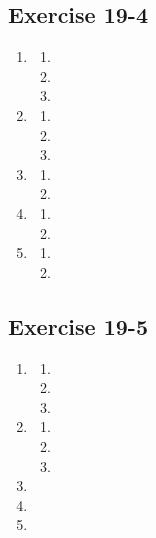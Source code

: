 \subsection{Exercise 19-4}
\begin{multicols}{4}
 \begin{enumerate}[noitemsep, label=\textbf{(\arabic*)} ]
  \item 
\begin{enumerate}[noitemsep, label=\textbf{(\alph*)} ]
 \item 
\item
\item
\end{enumerate}
  \item 
\begin{enumerate}[noitemsep, label=\textbf{(\alph*)} ]
 \item 
\item
\item 
\end{enumerate}
\item
\begin{enumerate}[noitemsep, label=\textbf{(\alph*)} ]
 \item 
\item
\end{enumerate}
\item
\begin{enumerate}[noitemsep, label=\textbf{(\alph*)} ]
 \item 
\item
\end{enumerate}
\item
\begin{enumerate}[noitemsep, label=\textbf{(\alph*)} ]
 \item 
\item
\end{enumerate}
 \end{enumerate}
\end{multicols}

\subsection{Exercise 19-5}
\begin{multicols}{4}
 \begin{enumerate}[noitemsep, label=\textbf{(\arabic*)} ]
  \item 
\begin{enumerate}[noitemsep, label=\textbf{(\alph*)} ]
 \item 
\item
\item
\end{enumerate}
  \item 
\begin{enumerate}[noitemsep, label=\textbf{(\alph*)} ]
 \item 
\item
\item 
\end{enumerate}
\item
\item
\item
 \end{enumerate}
\end{multicols}

